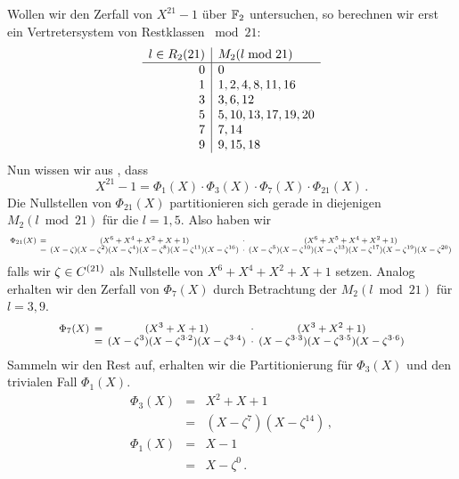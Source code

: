 \begin{beispiel}
  \label{beispiel:zerfall_x21_1_1}
  Wollen wir den Zerfall von $X^{21}-1$ über $\mathbb{F}_2$ untersuchen, so berechnen
  wir erst ein Vertretersystem von Restklassen $\bmod{21}$:
  \[\begin{array}[t]{r|l}
    l \in R_2(21) & M_2(l \bmod{21}) \\\hline
    0 & 0 \\
    1 & 1, 2, 4, 8, 11, 16 \\
    3 & 3, 6, 12 \\
    5 & 5, 10, 13, 17, 19, 20 \\
    7 & 7, 14 \\
    9 & 9, 15, 18
  \end{array}\]
  Nun wissen wir aus , dass 
  \[ X^{21} -1 = \Phi_1(X) \cdot \Phi_3(X) \cdot \Phi_7(X) \cdot
  \Phi_{21}(X)\,.\]
  Die Nullstellen von $\Phi_{21}(X)$ partitionieren sich gerade in
  diejenigen $M_2(l\bmod{21})$ für die $l=1,5$.
  Also haben wir 
  \[\footnotesize\setlength{\arraycolsep}{2pt}\everymath{\displaystyle}
    \begin{array}{rcccc} 
      \Phi_{21}(X) &=& (X^{6} + X^{4} + X^{2} + X + 1) 
        &\cdot& (X^{6} + X^{5} + X^{4} + X^{2} + 1) \\
      &=& (X-\zeta)(X-\zeta^2)(X-\zeta^4)(X-\zeta^8)(X-\zeta^{11})
        (X-\zeta^{16}) &\cdot&
        (X-\zeta^5)(X-\zeta^{10})(X-\zeta^{13})(X-\zeta^{17})
        (X-\zeta^{19})(X-\zeta^{20})\,
    \end{array}\]
  falls wir $\zeta \in C^{(21)}$ als Nullstelle von
  $X^6+X^4+X^2+X+1$ setzen.
  Analog erhalten wir den Zerfall von $\Phi_7(X)$ durch Betrachtung der
  $M_2(l\bmod{21})$ für $l=3,9$. 
  \[\footnotesize\setlength{\arraycolsep}{2pt}\everymath{\displaystyle}
    \begin{array}{rcccc} 
      \Phi_7(X)&=& (X^{3} + X + 1) &\cdot& (X^{3} + X^{2} + 1) \\
      &=& (X-\zeta^3)(X-\zeta^{3\cdot 2})(X-\zeta^{3\cdot 4}) &\cdot&
        (X-\zeta^{3\cdot 3})(X-\zeta^{3\cdot 5})(X-\zeta^{3\cdot 6}) 
    \end{array}\]
  Sammeln wir den Rest auf, erhalten wir die Partitionierung für
  $\Phi_3(X)$ und den trivialen Fall $\Phi_1(X)$.
  \[ \begin{array}{rcc} 
    \Phi_3(X) &=& X^2 + X + 1\\
              &=& (X-\zeta^7)(X-\zeta^{14})\,,\\[10pt]
    \Phi_1(X) &=& X-1\\
             &=& X-\zeta^0\,.
    \end{array}\]
\end{beispiel}


